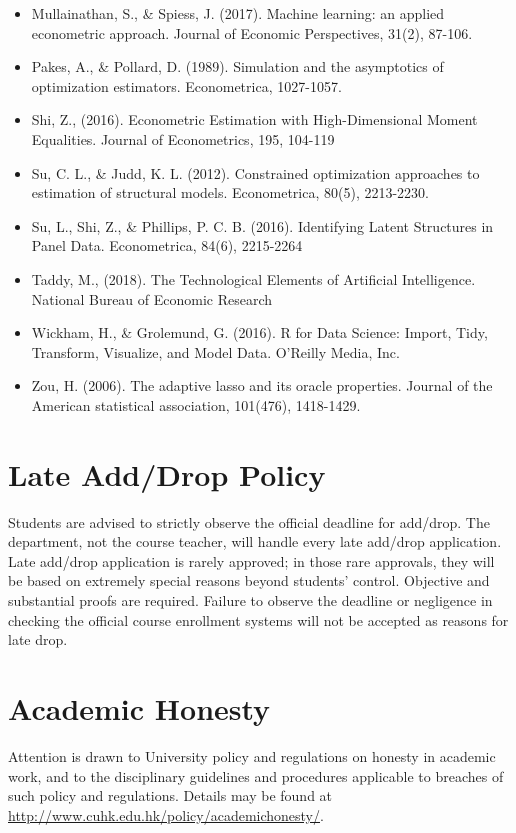 \documentclass[11pt]{article}
\begin{document}
\begin{itemize}
\item Mullainathan, S., \& Spiess, J. (2017). Machine learning: an applied econometric approach. Journal of Economic Perspectives, 31(2), 87-106.
\item Pakes, A., \& Pollard, D. (1989). Simulation and the asymptotics of optimization estimators. Econometrica, 1027-1057. 
\item Shi, Z., (2016). Econometric Estimation with High-Dimensional Moment Equalities. Journal of Econometrics, 195, 104-119 
\item Su, C. L., \& Judd, K. L. (2012). Constrained optimization approaches to estimation of structural models. Econometrica, 80(5), 2213-2230.
\item Su, L., Shi, Z., \& Phillips, P. C. B. (2016). Identifying Latent Structures in Panel Data. Econometrica, 84(6), 2215-2264
\item Taddy, M., (2018). The Technological Elements of Artificial Intelligence. National Bureau of Economic Research 
\item Wickham, H., \& Grolemund, G.  (2016). R for Data Science: Import, Tidy, Transform, Visualize, and Model Data. O’Reilly Media, Inc. 
\item Zou, H. (2006). The adaptive lasso and its oracle properties. Journal of the American statistical association, 101(476), 1418-1429.
\end{itemize}



\section*{Late Add/Drop Policy}

Students are advised to strictly observe the official deadline for add/drop. The department, not the course teacher, will handle every late add/drop application. Late add/drop application is rarely approved; in those rare approvals, they will be based on extremely special reasons beyond students' control. Objective and substantial proofs are required. Failure to observe the deadline or negligence in checking the official course enrollment systems will not be accepted as reasons for late drop.


\section*{Academic Honesty}
Attention is drawn to University policy and regulations on honesty in academic work, and to the disciplinary guidelines and procedures applicable to breaches of such policy and regulations. Details may be found at \url{http://www.cuhk.edu.hk/policy/academichonesty/}. 
\end{document}
